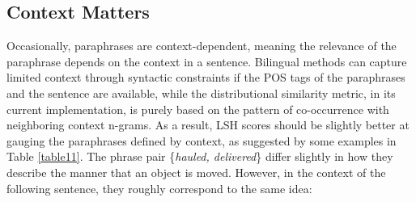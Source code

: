 \documentclass[11pt]{article}
\newcommand{\mnote}[1]{\marginpar{\raggedleft\footnotesize\itshape#1}}
\begin{document}
%
%


\vspace{-.1cm}
\subsection{Context Matters}
\vspace{-.2cm}
Occasionally, paraphrases are context-dependent, meaning the relevance of the paraphrase depends on the context in a sentence. Bilingual methods can capture limited context through syntactic constraints if the POS tags of the paraphrases and the sentence are available, while the distributional similarity metric, in its current implementation, is purely based on the pattern of co-occurrence with neighboring context n-grams. As a result, LSH scores should be slightly better at gauging the paraphrases defined by context, as suggested by some examples in Table \ref{table11}. The phrase pair \{\emph{hauled, delivered}\} differ slightly in how they describe the manner that an object is moved. However, in the context of the following sentence, they roughly correspond to the same idea:
\end{document}
